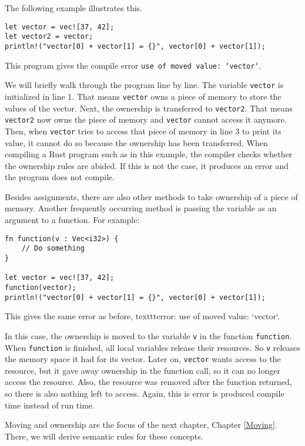 The following example illustrates this. 
\begin{verbatim}
let vector = vec![37, 42];
let vector2 = vector;
println!("vector[0] + vector[1] = {}", vector[0] + vector[1]);
\end{verbatim}
This program gives the compile error \texttt{use of moved value: `vector`}. 

We will briefly walk through the program line by line. The variable \verb|vector| is initialized in line 1. That means \verb|vector| owns a piece of memory to store the values of the vector. Next, the ownership is transferred to \verb|vector2|. That means \verb|vector2| now owns the piece of memory and \verb|vector| cannot access it anymore. Then, when \verb|vector| tries to access that piece of memory in line 3 to print its value, it cannot do so because the ownership has been transferred. When compiling a Rust program such as in this example, the compiler checks whether the ownership rules are abided. If this is not the case, it produces an error and the program does not compile. 

Besides assignments, there are also other methods to take ownership of a piece of memory. Another frequently occurring method is passing the variable as an argument to a function. For example:

\begin{verbatim}
fn function(v : Vec<i32>) {
    // Do something
}

let vector = vec![37, 42];
function(vector);
println!("vector[0] + vector[1] = {}", vector[0] + vector[1]);
\end{verbatim}
This gives the same error as before, texttt{error: use of moved value: `vector`}. 

In this case, the ownership is moved to the variable \verb|v| in the function \texttt{function}. When \verb|function| is finished, all local variables release their resources. So \verb|v| releases the memory space it had for its vector. Later on, \verb|vector| wants access to the resource, but it gave away ownership in the function call, so it can no longer access the resource. Also, the resource was removed after the function returned, so there is also nothing left to access. Again, this is error is produced compile time instead of run time. 

Moving and ownership are the focus of the next chapter, Chapter \ref{Moving}. There, we will derive semantic rules for these concepts. 

